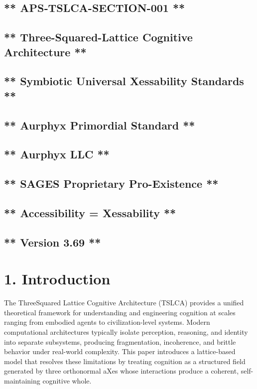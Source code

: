 \subsection{** APS‑TSLCA-SECTION-001 **}\label{apstslca-section-001}

\subsection{** Three-Squared-Lattice Cognitive Architecture **}\label{three-squared-lattice-cognitive-architecture}

\subsection{** Symbiotic Universal Xessability Standards **}\label{symbiotic-universal-xessability-standards}

\subsection{** Aurphyx Primordial Standard **}\label{aurphyx-primordial-standard}

\subsection{** Aurphyx LLC **}\label{aurphyx-llc}

\subsection{** SAGES \textbar{} Proprietary \textbar{} Pro-Existence **}\label{sages-proprietary-pro-existence}

\subsection{** Accessibility = Xessability **}\label{accessibility-xessability}

\subsection{** Version 3.69 **}\label{version-3.69}

\section{1. Introduction}\label{introduction}

The ThreeSquared Lattice Cognitive Architecture (TSLCA) provides a unified theoretical framework for understanding and engineering cognition at scales ranging from embodied agents to civilization-level systems. Modern computational architectures typically isolate perception, reasoning, and identity into separate subsystems, producing fragmentation, incoherence, and brittle behavior under real-world complexity. This paper introduces a lattice-based model that resolves these limitations by treating cognition as a structured field generated by three orthonormal aXes whose interactions produce a coherent, self-maintaining cognitive whole.

